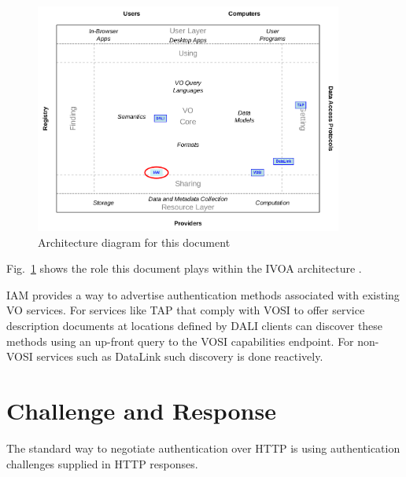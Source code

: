 \documentclass[11pt,a4paper]{ivoa}
\begin{document}
\begin{figure}
\centering


\includegraphics[width=0.9\textwidth]{role_diagram.pdf}
\caption{Architecture diagram for this document}
\label{fig:archdiag}
\end{figure}

Fig.~\ref{fig:archdiag} shows the role this document plays within the
IVOA architecture \citep{2021ivoa.spec.1101D}.

IAM provides a way to advertise authentication methods
associated with existing VO services.
For services like TAP \citep{2019ivoa.spec.0927D}
that comply with VOSI \citep{2017ivoa.spec.0524G} to
offer service description documents at locations
defined by DALI \citep{2017ivoa.spec.0517D}
clients can discover these methods
using an up-front query to the VOSI capabilities endpoint.
For non-VOSI services such as DataLink \citep{2015ivoa.spec.0617D}
such discovery is done reactively.




\section{Challenge and Response}

The standard way to negotiate authentication over HTTP is using 
authentication challenges supplied in HTTP responses.
\end{document}
